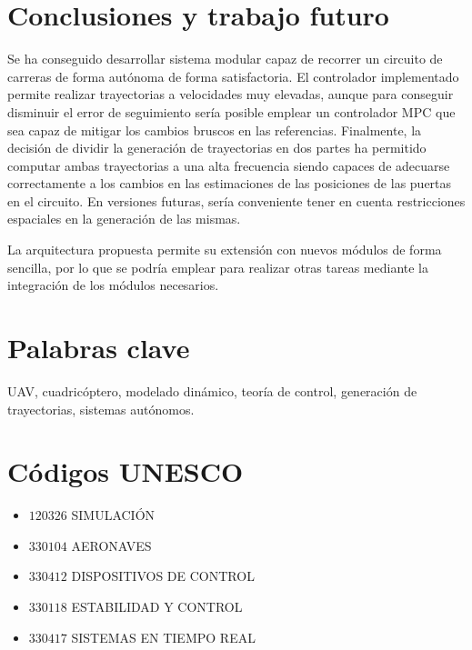 \section*{Conclusiones y trabajo futuro}

Se ha conseguido desarrollar sistema modular capaz de recorrer un circuito de carreras de forma autónoma de forma satisfactoria. El controlador implementado permite realizar trayectorias a velocidades muy elevadas, aunque para conseguir disminuir el error de seguimiento sería posible emplear un controlador MPC que sea capaz de mitigar los cambios bruscos en las referencias. Finalmente, la decisión de dividir la generación de trayectorias en dos partes ha permitido computar ambas trayectorias a una alta frecuencia siendo capaces de adecuarse correctamente a los cambios en las estimaciones de las posiciones de las puertas en el circuito. En versiones futuras, sería conveniente tener en cuenta restricciones espaciales en la generación de las mismas.

La arquitectura propuesta permite su extensión con nuevos módulos de forma sencilla, por lo que se podría emplear para realizar otras tareas mediante la integración de los módulos necesarios.

\newpage
\section*{Palabras clave}
UAV, cuadricóptero, modelado dinámico, teoría de control, generación de trayectorias, sistemas autónomos.

\section*{Códigos UNESCO}
\begin{itemize}
	\item[] $120326$ \quad SIMULACIÓN
	\item[] $330104$ \quad AERONAVES
	\item[] $330412$ \quad DISPOSITIVOS DE CONTROL
	\item[]	$330118$ \quad ESTABILIDAD Y CONTROL
	\item[] $330417$ \quad SISTEMAS EN TIEMPO REAL 
		

\end{itemize}
\newpage
\cleardoublepage